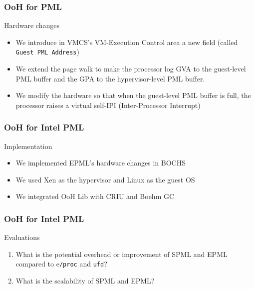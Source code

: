 \documentclass[xcolor=table,bigger,unknownkeysallowed]{beamer}
\begin{document}
        \begin{frame}
                \frametitle{OoH for PML}			
			\begin{block}{Hardware changes}
				\begin{itemize}
					\item We introduce in VMCS's VM-Execution Control area a new field (called \texttt{Guest PML Address})
					\item We extend the page walk to make the processor log GVA to the guest-level PML buffer and the GPA to the hypervisor-level PML buffer.
					\item We modify the hardware so that when the guest-level PML buffer is full, the processor raises a virtual self-IPI (Inter-Processor Interrupt)
				\end{itemize}
			\end{block} 
        \end{frame}     
        \begin{frame}
                \frametitle{OoH for Intel PML}			
			\begin{block}{Implementation}
				\begin{itemize}
					\item We implemented EPML's hardware changes in BOCHS				
					\item We used Xen as the hypervisor and Linux as the guest OS
					\item We integrated OoH Lib with CRIU and Boehm GC
				\end{itemize}
			\end{block} 
        \end{frame}
        \begin{frame}
                \frametitle{OoH for Intel PML}			
			\begin{block}{Evaluations}
				\begin{enumerate}
					\item What is the potential overhead or improvement of SPML and EPML compared to e\texttt{/proc} and \texttt{ufd}?
					\item What is the scalability of SPML and EPML?
				\end{enumerate}
			\end{block} 
        \end{frame}
\end{document}
